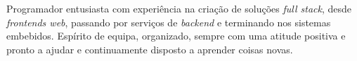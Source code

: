 
\begin{cventries}

\cventry
{}{}{}{}
{
	Programador entusiasta com experiência na criação de soluções \textit{full stack}, desde \textit{frontends web}, passando por serviços de \textit{backend} e terminando nos sistemas embebidos.
	\newline Espírito de equipa, organizado, sempre com uma atitude positiva e pronto a ajudar e continuamente disposto a aprender coisas novas.
}

\end{cventries}
